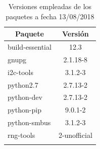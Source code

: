 \documentclass[12pt,a4paper, twoside]{report}
\begin{document}
\begin{enumerate}
\begin{longtable}{|m{4cm}|m{4cm}|}
			\multicolumn{1}{|c|}{\textbf{Paquete}} & \multicolumn{1}{|c|}{\textbf{Versión}} \\ \hline
			\multicolumn{1}{|l|}{build-essential} & \multicolumn{1}{c|}{12.3} \\ \hline
			\multicolumn{1}{|l|}{gnupg} & \multicolumn{1}{c|}{2.1.18-8} \\ \hline
			\multicolumn{1}{|l|}{i2c-tools} & \multicolumn{1}{c|}{3.1.2-3} \\ \hline
			\multicolumn{1}{|l|}{python2.7} & \multicolumn{1}{c|}{2.7.13-2} \\ \hline
			\multicolumn{1}{|l|}{python-dev} & \multicolumn{1}{c|}{2.7.13-2} \\ \hline
			\multicolumn{1}{|l|}{python-pip} & \multicolumn{1}{c|}{9.0.1-2} \\ \hline
			\multicolumn{1}{|l|}{python-smbus} & \multicolumn{1}{c|}{3.1.2-3} \\ \hline
			\multicolumn{1}{|l|}{rng-tools} & \multicolumn{1}{c|}{2-unofficial} \\ \hline
					
			\caption{Versiones empleadas de los paquetes a fecha 13/08/2018}
		\end{longtable}
		

\end{enumerate}
\end{document}
